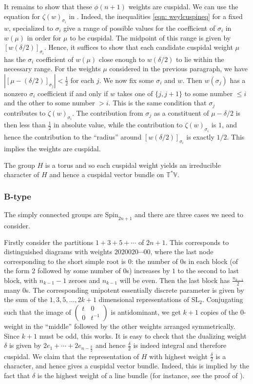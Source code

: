 \documentclass{amsart}
\theoremstyle{definition}
\theoremstyle{remark}
\numberwithin{equation}{section}
\newcommand{\SL}{\mathrm{SL}}
\newcommand{\Spin}{\mathrm{Spin}}
\newcommand{\V}{\mathbb{V}}
\newcommand{\T}{\mathbb{T}}
\begin{document}
It remains to show that these $\phi(n+1)$ weights are cuspidal. We can use the equation for $\zeta(w)_{\sigma_i}$ in \cite[\S2]{BMKL}. Indeed, the inequalities \eqref{eqn: weylcuspineq} for a fixed $w$, specialized to $\sigma_i$ give a range of possible values for the coefficient of $\sigma_i$ in $w(\mu)$ in order for $\mu$ to be cuspidal. The midpoint of this range is given by $[w(\delta/2)]_{\sigma_i}$. Hence, it suffices to show that each candidate cuspidal weight $\mu$ has the $\sigma_i$ coefficient of $w(\mu)$ close enough to $w(\delta/2)$ to lie within the necessary range. For the weights $\mu$ considered in the previous paragraph, we have $|[\mu - (\delta/2)]_{\sigma_j}|<\frac{1}{2}$ for each $j$. We now fix some $\sigma_i$ and $w$. Then $w(\sigma_j)$ has a nonzero $\sigma_i$ coefficient if and only if $w$ takes one of  $\{j, j+1\}$ to some number $\leq i$ and the other to some number $> i$. This is the same condition that $\sigma_j$ contributes to $\zeta(w)_{\sigma_i}$. The contribution from $\sigma_j$ as a constituent of $\mu-\delta/2$ is then less than $\frac{1}{2}$ in absolute value, while the contribution to $\zeta(w)_{\sigma_i}$ is $1$, and hence the contribution to the ``radius'' around $[w(\delta/2)]_{\sigma_i}$ is exactly $1/2$. This implies the weights are cuspidal.

The group $H$ is a torus and so each cuspidal weight yields an irreducible character of $H$ and hence a cuspidal vector bundle on $\T^{\ast}\V$.
 
\subsubsection{B-type}
The simply connected groups are $\Spin_{2n+1}$ and there are three cases we need to consider.

Firstly consider the partitions $1+3+5+\cdots$ of $2n+1$. This corresponds to distinguished diagrams with weights $2020020\cdots 00$, where the last node corresponding to the short simple root is $0$: the number of $0$s in each block (of the form $2$ followed by some number of $0$s) increases by $1$ to the second to last block, with $n_{k-1}-1$ zeroes and $n_{k-1}$ will be even. Then the last block has $
\frac{n_{k-1}}{2}$ many $0$s. The corresponding unipotent essentially discrete parameter is given by the sum of the $1,3,5, \dots, 2k+1$ dimensional representations of $\SL_2$. Conjugating such that the image of $\begin{pmatrix} t & 0 \\ 0 & t^{-1} \end{pmatrix}$ is antidominant,  we get $k+1$ copies of the $0$-weight in the ``middle'' followed by the other weights arranged symmetrically. Since $k+1$ must be odd, this works. It is easy to check that the dualizing weight $\delta$ is given by $2e_1 + \cdots +2e_{n-\frac{k}{2}}$ and hence $\frac{\delta}{2}$ is indeed integral and therefore cuspidal. We claim that the representation of $H$ with highest weight $\frac{\delta}{2}$ is a character, and hence gives a cuspidal vector bundle. Indeed, this is implied by the fact that $\delta$ is the highest weight of a line bundle (for instance, see the proof of \cite[Lemma 4.1]{BMO}). 
\end{document}
